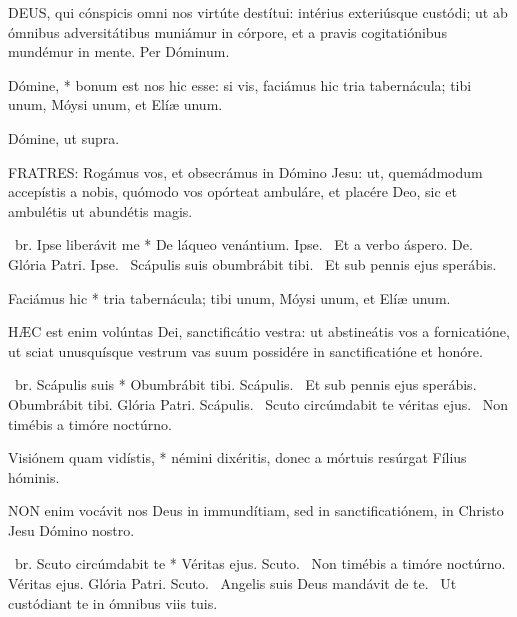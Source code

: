 
\lettrine[lines=2]{D}{EUS}, qui cónspicis omni nos virtúte destítui: intérius exteriúsque custódi; ut ab ómnibus adversitátibus muniámur in córpore, et a pravis cogitatiónibus mundémur in mente. Per Dóminum.


 Dómine, * bonum est nos hic esse: si vis, faciámus hic tria tabernácula; tibi unum, Móysi unum, et Elíæ unum.


 Dómine, ut supra.


\lettrine[lines=2]{F}{RATRES}: Rogámus vos, et obsecrámus in Dómino Jesu: ut, quemádmodum accepístis a nobis, quómodo vos opórteat ambuláre, et placére Deo, sic et ambulétis ut abundétis magis.

\R\ br. Ipse liberávit me * De láqueo venántium. Ipse. \V\ Et a verbo áspero. De. Glória Patri. Ipse. \V\ Scápulis suis obumbrábit tibi. \R\ Et sub pennis ejus sperábis.


 Faciámus hic * tria tabernácula; tibi unum, Móysi unum, et Elíæ unum.


\lettrine[lines=2]{H}{ÆC} est enim volúntas Dei, sanctificátio vestra: ut abstineátis vos a fornicatióne, ut sciat unusquísque vestrum vas suum possidére in sanctificatióne et honóre.

\R\ br. Scápulis suis * Obumbrábit tibi. Scápulis. \V\ Et sub pennis ejus sperábis. Obumbrábit tibi. Glória Patri. Scápulis. \V\ Scuto circúmdabit te véritas ejus. \R\ Non timébis a timóre noctúrno.


 Visiónem quam vidístis, * némini dixéritis, donec a mórtuis resúrgat Fílius hóminis.


\lettrine[lines=2]{N}{ON} enim vocávit nos Deus in immundítiam, sed in sanctificatiónem, in Christo Jesu Dómino nostro.

\R\ br. Scuto circúmdabit te * Véritas ejus. Scuto. \V\ Non timébis a timóre noctúrno. Véritas ejus. Glória Patri. Scuto. \V\ Angelis suis Deus mandávit de te. \R\ Ut custódiant te in ómnibus viis tuis.

